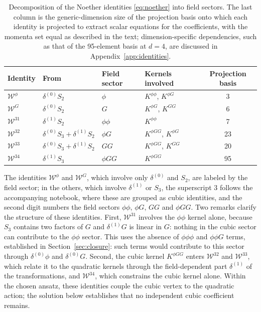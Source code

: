 \documentclass[prd,aps,preprint,nofootinbib,amsmath,amssymb,eqsecnum]{revtex4-2}
\newcommand{\W}{\mathcal{W}}
\begin{document}
\begin{table}[htb]
\centering
\setlength{\tabcolsep}{10pt}
\begin{tabular}{@{}llllc@{}}
\toprule
Identity & From & Field sector & Kernels involved & Projection basis \\
\midrule
$\W^{\phi}$  & $\delta^{(0)}S_2$ & $\phi$   & $K^{\phi\phi}$, $K^{\phi G}$ & 3 \\
$\W^{G}$     & $\delta^{(0)}S_2$ & $G$      & $K^{\phi G}$, $K^{GG}$ & 6 \\
$\W^{31}$    & $\delta^{(1)}S_2$ & $\phi\phi$ & $K^{\phi\phi}$ & 7 \\
$\W^{32}$    & $\delta^{(0)}S_3+\delta^{(1)}S_2$ & $\phi G$ & $K^{\phi GG}$, $K^{\phi G}$ & 23 \\
$\W^{33}$    & $\delta^{(0)}S_3+\delta^{(1)}S_2$ & $GG$ & $K^{\phi GG}$, $K^{GG}$ & 20 \\
$\W^{34}$    & $\delta^{(1)}S_3$ & $\phi GG$ & $K^{\phi GG}$ & 95 \\
\bottomrule
\end{tabular}
\caption{Decomposition of the Noether identities \eqref{eq:noether} into field sectors. The
last column is the generic-dimension size of the projection basis onto which each identity
is projected to extract scalar equations for the coefficients, with the momenta
set equal as described in the text; dimension-specific dependencies, such as that of the
95-element basis at $d=4$, are discussed in Appendix~\ref{app:identities}.}
\label{tab:identities}
\end{table}

The identities $\W^{\phi}$ and $\W^{G}$, which involve only $\delta^{(0)}$ and $S_2$, are
labeled by the field sector; in the others, which involve $\delta^{(1)}$ or $S_3$, the
superscript $3$ follows the accompanying notebook, where these are grouped as cubic
identities, and the second digit numbers the field sectors $\phi\phi$, $\phi G$, $GG$ and
$\phi GG$. Two remarks clarify the structure of these identities. First,
$\W^{31}$ involves the $\phi\phi$ kernel alone, because $S_3$ contains two factors of $G$ and
$\delta^{(1)}G$ is linear in $G$: nothing in the cubic sector can contribute to the $\phi\phi$ sector. This uses the absence of $\phi\phi\phi$ and $\phi\phi G$ terms, established in
Section~\ref{sec:closure}: such terms would contribute to this sector through $\delta^{(0)}\phi$
and $\delta^{(0)}G$.
Second, the cubic kernel $K^{\phi GG}$ enters $\W^{32}$ and $\W^{33}$, which relate it to
the quadratic kernels through the field-dependent part $\delta^{(1)}$ of the
transformations, and $\W^{34}$, which constrains the cubic kernel alone. Within the chosen
ansatz, these identities couple the cubic vertex to the quadratic action; the solution
below establishes that no independent cubic coefficient remains.
\end{document}
